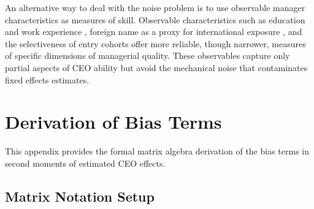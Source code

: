 \documentclass[11pt,a4paper]{article}
\begin{document}
An alternative way to deal with the noise problem is to use observable manager characteristics as measures of skill. Observable characteristics such as education and work experience \citep{DePirro2025}, foreign name as a proxy for international exposure \citep{Koren2023expat}, and the selectiveness of entry cohorts \citep{koren2024managers} offer more reliable, though narrower, measures of specific dimensions of managerial quality. These observables capture only partial aspects of CEO ability but avoid the mechanical noise that contaminates fixed effects estimates.

\clearpage



\clearpage
\appendix
\renewcommand{\thefigure}{A\arabic{figure}}
\renewcommand{\thetable}{A\arabic{table}}
\setcounter{figure}{0}
\setcounter{table}{0}

\section{Derivation of Bias Terms}

This appendix provides the formal matrix algebra derivation of the bias terms in second moments of estimated CEO effects.

\subsection{Matrix Notation Setup}
\end{document}
